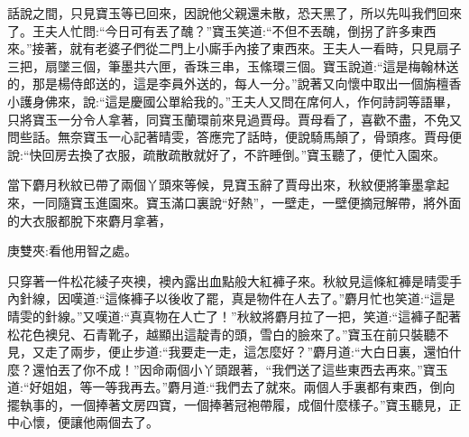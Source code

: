\begin{parag}
    話說之間，只見寶玉等已回來，因說他父親還未散，恐天黑了，所以先叫我們回來了。王夫人忙問:“今日可有丟了醜？”寶玉笑道:“不但不丟醜，倒拐了許多東西來。”接著，就有老婆子們從二門上小廝手內接了東西來。王夫人一看時，只見扇子三把，扇墜三個，筆墨共六匣，香珠三串，玉絛環三個。寶玉說道:“這是梅翰林送的，那是楊侍郎送的，這是李員外送的，每人一分。”說著又向懷中取出一個旃檀香小護身佛來，說:“這是慶國公單給我的。”王夫人又問在席何人，作何詩詞等語畢，只將寶玉一分令人拿著，同寶玉蘭環前來見過賈母。賈母看了，喜歡不盡，不免又問些話。無奈寶玉一心記著晴雯，答應完了話時，便說騎馬顛了，骨頭疼。賈母便說:“快回房去換了衣服，疏散疏散就好了，不許睡倒。”寶玉聽了，便忙入園來。
\end{parag}


\begin{parag}
    當下麝月秋紋已帶了兩個丫頭來等候，見寶玉辭了賈母出來，秋紋便將筆墨拿起來，一同隨寶玉進園來。寶玉滿口裏說“好熱”，一壁走，一壁便摘冠解帶，將外面的大衣服都脫下來麝月拿著，\begin{note}庚雙夾:看他用智之處。\end{note}只穿著一件松花綾子夾襖，襖內露出血點般大紅褲子來。秋紋見這條紅褲是晴雯手內針線，因嘆道:“這條褲子以後收了罷，真是物件在人去了。”麝月忙也笑道:“這是晴雯的針線。”又嘆道:“真真物在人亡了！”秋紋將麝月拉了一把，笑道:“這褲子配著松花色襖兒、石青靴子，越顯出這靛青的頭，雪白的臉來了。”寶玉在前只裝聽不見，又走了兩步，便止步道:“我要走一走，這怎麼好？”麝月道:“大白日裏，還怕什麼？還怕丟了你不成！”因命兩個小丫頭跟著，“我們送了這些東西去再來。”寶玉道:“好姐姐，等一等我再去。”麝月道:“我們去了就來。兩個人手裏都有東西，倒向擺執事的，一個捧著文房四寶，一個捧著冠袍帶履，成個什麼樣子。”寶玉聽見，正中心懷，便讓他兩個去了。
\end{parag}



